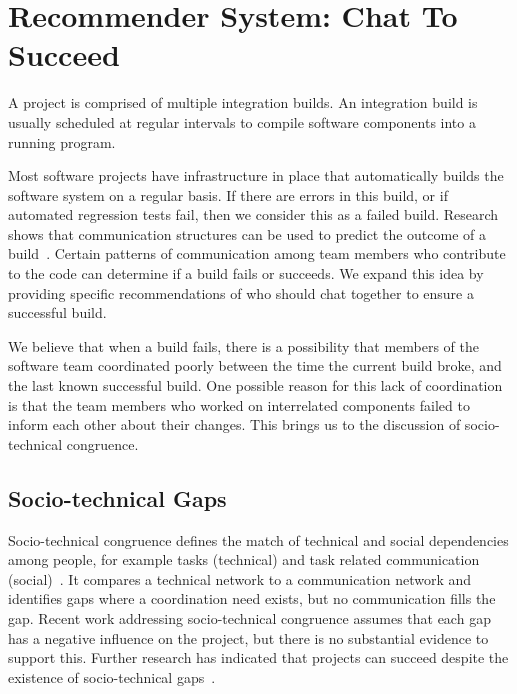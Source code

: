 \label{chap:actionable}

\section{Recommender System: Chat To Succeed}

A project is comprised of multiple integration builds. An 
integration build is usually scheduled at regular intervals to 
compile software components into a running program. 

Most software projects have infrastructure in place that automatically builds the software system on a regular basis. If there are errors in this build, or if automated regression tests fail, then we consider this as a failed build.  Research shows that communication structures can be used 
to predict the outcome of a build~\cite{wolf:tr2008}.  Certain patterns of 
communication among team members who contribute to the 
code can determine if a build fails or succeeds. We expand this idea by providing specific recommendations of 
who should chat together to ensure a successful build.

We believe that when a build fails, there is a possibility that members of the software team coordinated poorly between the time the current build broke, and the last known successful build. One possible reason for this lack of coordination is that the team members who worked on interrelated components failed to inform each other about their changes. This brings us to the discussion of socio-technical congruence.


\subsection{Socio-technical Gaps}


Socio-technical congruence defines the match of technical 
and social dependencies among people, for example tasks 
(technical) and task related communication (social)~\cite{cataldo:cscw:2006}. It 
compares a technical network to a communication network 
and identifies gaps where a coordination need exists, but no 
communication fills the gap. Recent work addressing socio-technical congruence assumes that each gap has a negative 
influence on the project, but there is no substantial evidence 
to support this. Further research has indicated that projects 
can succeed despite the existence of socio-technical gaps~\cite{marczak:re:2008}.

